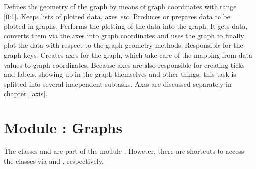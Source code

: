 \begin{definitions}
  Defines the geometry of the graph by means of graph coordinates with
  range [0:1]. Keeps lists of plotted data, axes \emph{etc.}
  Produces or prepares data to be plotted in graphs.
  Performs the plotting of the data into the graph. It gets data,
  converts them via the axes into graph coordinates and uses the graph
  to finally plot the data with respect to the graph geometry methods.
  Responsible for the graph keys.
  Creates axes for the graph, which take care of the mapping from data
  values to graph coordinates. Because axes are also responsible for
  creating ticks and labels, showing up in the graph themselves and
  other things, this task is splitted into several independent
  subtasks. Axes are discussed separately in chapter~\ref{axis}.
\end{definitions} %

\section{Module : Graphs} %
\label{graph:graph}


The classes  and  are part of the
module . However, there are shortcuts to access
the classes via  and ,
respectively.

